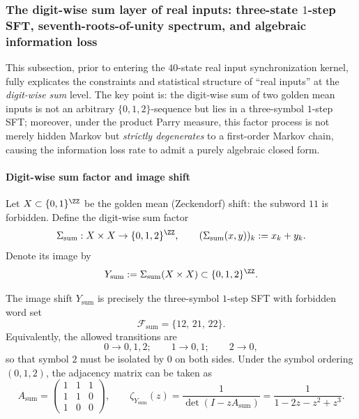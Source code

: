 \subsubsection{The digit-wise sum layer of real inputs: three-state \texorpdfstring{$1$}{1}-step SFT, seventh-roots-of-unity spectrum, and algebraic information loss}\label{app:real-input-digitwise-sum-layer}

This subsection, prior to entering the $40$-state real input synchronization kernel, fully explicates the constraints and statistical structure of ``real inputs'' at the \emph{digit-wise sum} level.
The key point is: the digit-wise sum of two golden mean inputs is not an arbitrary $\{0,1,2\}$-sequence but lies in a three-symbol $1$-step SFT; moreover, under the product Parry measure, this factor process is not merely hidden Markov but \emph{strictly degenerates} to a first-order Markov chain, causing the information loss rate to admit a purely algebraic closed form.

\paragraph{Digit-wise sum factor and image shift}
Let $X\subset\{0,1\}^{\ZZ}$ be the golden mean (Zeckendorf) shift: the subword $11$ is forbidden. Define the digit-wise sum factor
\[
\Sigma_{\mathrm{sum}}:X\times X\to\{0,1,2\}^{\ZZ},\qquad
(\Sigma_{\mathrm{sum}}(x,y))_k:=x_k+y_k.
\]
Denote its image by
\[
Y_{\mathrm{sum}}:=\Sigma_{\mathrm{sum}}(X\times X)\subset \{0,1,2\}^{\ZZ}.
\]

\begin{proposition}\label{prop:real-input-digitwise-sum-sft}
The image shift $Y_{\mathrm{sum}}$ is precisely the three-symbol $1$-step SFT with forbidden word set
\[
\mathcal{F}_{\mathrm{sum}}=\{12,\,21,\,22\}.
\]
Equivalently, the allowed transitions are
\[
0\to 0,1,2;\qquad 1\to 0,1;\qquad 2\to 0,
\]
so that symbol $2$ must be isolated by $0$ on both sides.
Under the symbol ordering $(0,1,2)$, the adjacency matrix can be taken as
\[
A_{\mathrm{sum}}=
\begin{pmatrix}
1&1&1\\
1&1&0\\
1&0&0
\end{pmatrix},
\qquad
\zeta_{Y_{\mathrm{sum}}}(z)=\frac{1}{\det(I-zA_{\mathrm{sum}})}=\frac{1}{1-2z-z^2+z^3}.
\]
\end{proposition}

